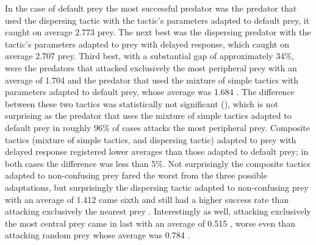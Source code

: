 In the case of default prey the most successful predator was the predator that used the dispersing tactic with the tactic's parameters adapted to default prey, it caught on average \num{2.773}  prey. The next best was the dispersing predator with the tactic's parameters adapted to prey with delayed response, which caught on average \num{2.707}  prey. Third best, with a substantial gap of approximately 34\%, were the predators that attacked exclusively the most peripheral prey with an average of \num{1.704}  and the predator that used the mixture of simple tactics with parameters adapted to default prey, whose average was \num{1.684} . The difference between these two tactics was statistically not significant (), which is not surprising as the predator that uses the mixture of simple tactics adapted to default prey in roughly 96\% of cases attacks the most peripheral prey. Composite tactics (mixture of simple tactics, and dispersing tactic) adapted to prey with delayed response registered lower averages than those adapted to default prey; in both cases the difference was less than 5\%. Not surprisingly the composite tactics adapted to non-confusing prey fared the worst from the three possible adaptations, but surprisingly the dispersing tactic adapted to non-confusing prey with an average of \num{1.412}  came sixth and still had a higher success rate than attacking exclusively the nearest prey . Interestingly as well, attacking exclusively the most central prey came in last with an average of \num{0.515} , worse even than attacking random prey whose average was \num{0.784} .

